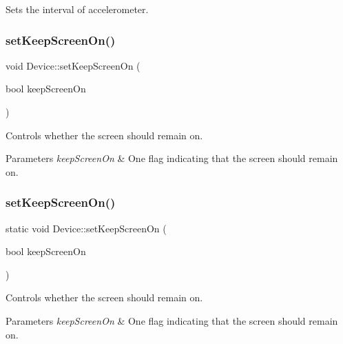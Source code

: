 Sets the interval of accelerometer. \mbox{\label{classDevice_a8c6700b3face65a74c38a231efda75c4}} 
\subsubsection{\texorpdfstring{set\+Keep\+Screen\+On()}{setKeepScreenOn()}\hspace{0.1cm}{\footnotesize\ttfamily [1/2]}}
{\footnotesize\ttfamily void Device\+::set\+Keep\+Screen\+On (\begin{DoxyParamCaption}\item[{bool}]{keep\+Screen\+On }\end{DoxyParamCaption})\hspace{0.3cm}{\ttfamily [static]}}

Controls whether the screen should remain on.


\begin{DoxyParams}{Parameters}
{\em keep\+Screen\+On} & One flag indicating that the screen should remain on. \\
\hline
\end{DoxyParams}
\mbox{\label{classDevice_aca10bab0f588d97ccd65c602f7bc70e0}} 
\subsubsection{\texorpdfstring{set\+Keep\+Screen\+On()}{setKeepScreenOn()}\hspace{0.1cm}{\footnotesize\ttfamily [2/2]}}
{\footnotesize\ttfamily static void Device\+::set\+Keep\+Screen\+On (\begin{DoxyParamCaption}\item[{bool}]{keep\+Screen\+On }\end{DoxyParamCaption})\hspace{0.3cm}{\ttfamily [static]}}

Controls whether the screen should remain on.


\begin{DoxyParams}{Parameters}
{\em keep\+Screen\+On} & One flag indicating that the screen should remain on. \\
\hline
\end{DoxyParams}
\mbox{\label{classDevice_afc60a7897697cbc80d90a017661b0a3b}} 
